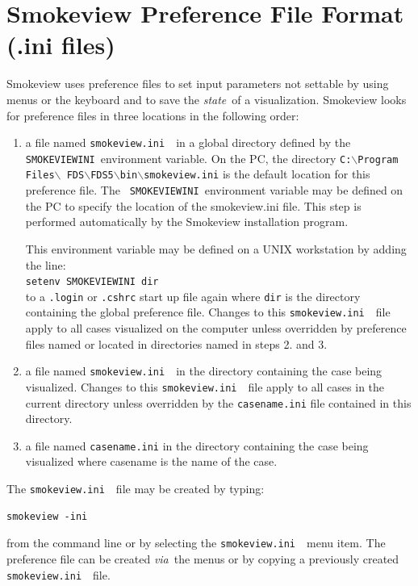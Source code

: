 \documentclass[11pt,twoside]{book}
\newcommand{\svini}{{\tt smokeview.ini}\ }
\begin{document}
\section{Smokeview Preference File Format (.ini files)}
\label{sectionconfig}
\label{appendixini}

Smokeview uses preference files to set input parameters not
settable by using menus or the keyboard and to save the {\em
state}\ of a visualization. Smokeview looks for preference files
in three locations in the following order:
\begin{enumerate}

\item a file named \svini\ in a global directory defined by the
{\tt SMOKEVIEWINI}\ environment variable. On the PC, the directory
{\tt C:$\backslash$Program Files$\backslash$
FDS$\backslash$FDS5$\backslash$bin$\backslash$smokeview.ini} is
the default location for this preference file. The {\tt
SMOKEVIEWINI}\ environment variable may be defined on the PC to
specify the location of the smokeview.ini file. This step is
performed automatically by the Smokeview installation program.

This environment variable may be
defined on a UNIX workstation by adding the line:\\

{\tt setenv SMOKEVIEWINI dir} \\

to a {\tt .login}  or {\tt .cshrc} start up file
again where {\tt dir} is the directory containing the
global preference file. Changes to this \svini\
file apply to all cases visualized on the computer unless
overridden by preference files named or located in
directories named in steps 2. and  3.

\item a file named \svini\ in the directory
containing the case being visualized.  Changes to
this \svini\ file apply to all cases in the current
directory unless overridden by the {\tt casename.ini} file
contained in this directory.

\item a file named {\tt casename.ini} in the directory containing the case being
visualized where casename is the name of the case.
\end{enumerate}

The \svini\ file may be created by typing:
\begin{lstlisting}
smokeview -ini
\end{lstlisting}
\noindent from the command line or by selecting the \svini\ menu item.
The \fbox{\tt casename.ini}
preference file can be created {\em via}\ the menus or by copying a
previously created \svini\ file.
\end{document}

